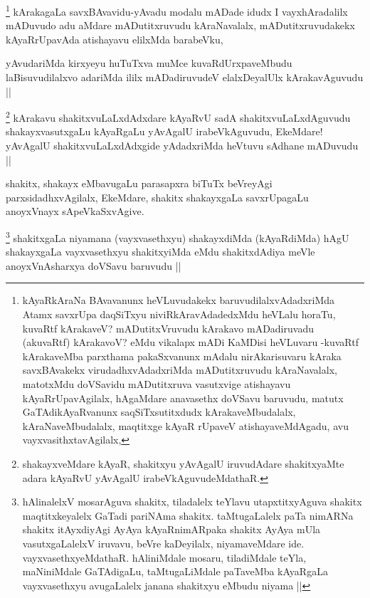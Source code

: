 
\begin{artha}
\footnote{kAyaRkAraNa  BAvavanunx heVLuvudakekx baruvudilalxvAdadxriMda Atamx savxrUpa daqSiTxyu niviRkAravAdadedxMdu heVLalu horaTu, kuvaRtf kArakaveV? mADutitxVruvudu kArakavo mADadiruvadu (akuvaRtf) kArakavoV? eMdu vikalapx mADi KaMDisi heVLuvaru -kuvaRtf kArakaveMba parxthama pakaSxvanunx mAdalu nirAkarisuvaru kAraka savxBAvakekx virudadhxvAdadxriMda mADutitxruvudu kAraNavalalx, matotxMdu doVSavidu mADutitxruva vasutxvige atishayavu kAyaRrUpavAgilalx, hAgaMdare anavasethx doVSavu baruvudu, matutx GaTAdikAyaRvanunx saqSiTxsutitxdudx kArakaveMbudalalx, kAraNaveMbudalalx, maqtitxge kAyaR rUpaveV atishayaveMdAgadu, avu vayxvasithxtavAgilalx, }
kArakagaLa savxBAvavidu-yAvadu modalu mADade idudx I vayxhAradalilx mADuvudo adu aMdare mADutitxruvudu kAraNavalalx, mADutitxruvudakekx kAyaRrUpavAda atishayavu elilxMda barabeVku,
\end{artha}


\begin{artha}
yAvudariMda kirxyeyu huTuTxva muMce kuvaRdUrxpaveMbudu laBisuvudilalxvo adariMda ililx mADadiruvudeV elalxDeyalUlx kArakavAguvudu ||
\end{artha}


\begin{artha}
\footnote{shakayxveMdare kAyaR, shakitxyu yAvAgalU iruvudAdare shakitxyaMte adara kAyaRvU yAvAgalU irabeVkAguvudeMdathaR.}
kArakavu shakitxvuLaLxdAdxdare kAyaRvU sadA shakitxvuLaLxdAguvudu shakayxvasutxgaLu kAyaRgaLu yAvAgalU irabeVkAguvudu, EkeMdare! yAvAgalU shakitxvuLaLxdAdxgide yAdadxriMda heVtuvu sAdhane mADuvudu ||
\end{artha}

\begin{artha}
shakitx, shakayx eMbavugaLu parasapxra biTuTx beVreyAgi parxsidadhxvAgilalx, EkeMdare, shakitx shakayxgaLa savxrUpagaLu anoyxVnayx sApeVkaSxvAgive.
\end{artha}


\begin{artha}
\footnote{hAlinalelxV mosarAguva shakitx, tiladalelx teYlavu utapxtitxyAguva shakitx maqtitxkeyalelx GaTadi pariNAma shakitx. taMtugaLalelx paTa nimARNa shakitx itAyxdiyAgi AyAya kAyaRnimARpaka shakitx AyAya mUla vasutxgaLalelxV iruvavu, beVre kaDeyilalx, niyamaveMdare ide. vayxvasethxyeMdathaR. hAliniMdale mosaru, tiladiMdale teYla, maNiniMdale GaTAdigaLu, taMtugaLiMdale paTaveMba kAyaRgaLa vayxvasethxyu avugaLalelx janana shakitxyu eMbudu niyama ||}
shakitxgaLa niyamana (vayxvasethxyu) shakayxdiMda (kAyaRdiMda) hAgU shakayxgaLa vayxvasethxyu shakitxyiMda eMdu shakitxdAdiya meVle anoyxVnAsharxya doVSavu baruvudu ||
\end{artha}

